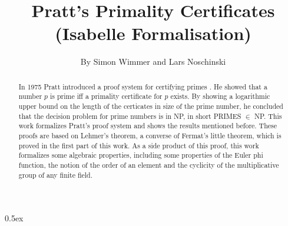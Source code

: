 \documentclass[11pt,a4paper]{article}
\begin{document}
\title{Pratt's Primality Certificates \\ (Isabelle Formalisation)}
\author{By Simon Wimmer and Lars Noschinski}
\maketitle

\begin{abstract}
  In 1975 Pratt introduced a proof system for certifying primes
  \cite{pratt1975certificate}.
  He showed that a number $p$ is prime iff a primality certificate for $p$ exists.
  By showing a logarithmic upper bound on the length of the certicates in size of the prime number,
  he concluded that the decision problem for prime numbers is in NP, in short PRIMES $\in$ NP.
  This work formalizes Pratt's proof system and shows the results mentioned before.  
  These proofs are based on Lehmer's theorem, a converse of Fermat's little theorem,
  which is proved in the first part of this work.
  As a side product of this proof, this work formalizes some algebraic properties, including
  some properties of the Euler phi function,
  the notion of the order of an element
  and the cyclicity of the multiplicative group of any finite field.
\end{abstract}

\tableofcontents

\parindent 0pt\parskip 0.5ex



\nocite{*}



\end{document}
